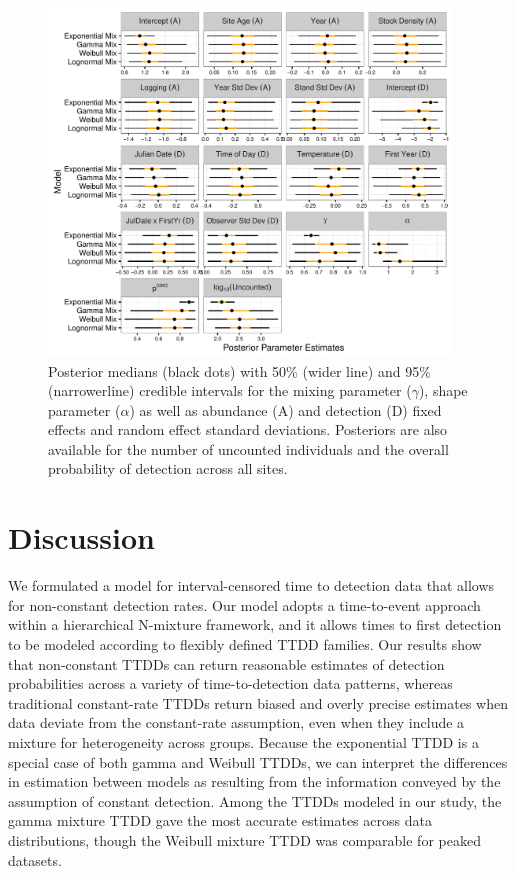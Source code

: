 \documentclass[12pt]{article}
\begin{document}
\begin{figure}[h!]\centering
\includegraphics[width=0.95\textwidth]{OVEN/oven_sum/OVEN_Posteriors}
\caption{\label{ovenposteriors} Posterior medians (black dots) with 50\% (wider line) and 95\% (narrowerline) credible intervals for the mixing parameter ($\gamma$), shape parameter ($\alpha$) as well as abundance (A) and detection (D) fixed effects and random effect standard deviations.
Posteriors are also available for the number of uncounted individuals and the overall probability of detection across all sites.}
\end{figure}





\section{Discussion} \label{sec:discuss}

We formulated a model for interval-censored time to detection data that allows for non-constant detection rates.
Our model adopts a time-to-event approach within a hierarchical N-mixture framework, and it allows times to first detection to be modeled according to flexibly defined TTDD families.
Our results show that non-constant TTDDs can return reasonable estimates of detection probabilities across a variety of time-to-detection data patterns, whereas traditional constant-rate TTDDs return biased and overly precise estimates when data deviate from the constant-rate assumption, even when they include a mixture for heterogeneity across groups.  
Because the exponential TTDD is a special case of both gamma and Weibull TTDDs, we can interpret the differences in estimation between models as resulting from the information conveyed by the assumption of constant detection.
Among the TTDDs modeled in our study, the gamma mixture TTDD gave the most accurate estimates across data distributions, though the Weibull mixture TTDD was comparable for peaked datasets.  
\end{document}
